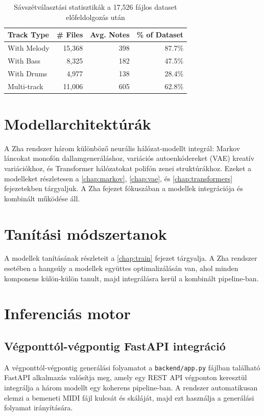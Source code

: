 \begin{table}[ht]
  \centering
  \begin{tabular}{lrrr}
    \toprule
    \textbf{Track Type} & \# Files & Avg. Notes & \% of Dataset \\
    \midrule
    With Melody  & 15,368 & 398 & 87.7\% \\
    With Bass    & 8,325  & 182 & 47.5\% \\
    With Drums   & 4,977  & 138 & 28.4\% \\
    Multi-track  & 11,006 & 605 & 62.8\% \\
    \bottomrule
  \end{tabular}
  \caption{Sávszétválasztási statisztikák a 17,526 fájlos dataset előfeldolgozás után}
\end{table}

\newpage
\section{Modellarchitektúrák}

A Zha rendszer három különböző neurális hálózat-modellt integrál: Markov láncokat monofón dallamgeneráláshoz, variációs autoenkódereket (VAE) kreatív variációkhoz, és Transformer hálózatokat polifón zenei struktúrákhoz. Ezeket a modelleket részletesen a \ref{chap:markov}, \ref{chap:vae}, és \ref{chap:transformers} fejezetekben tárgyaljuk. A Zha fejezet fókuszában a modellek integrációja és kombinált működése áll.

\section{Tanítási módszertanok}

A modellek tanításának részleteit a \ref{chap:train} fejezet tárgyalja. A Zha rendszer esetében a hangsúly a modellek együttes optimalizálásán van, ahol minden komponens külön-külön tanult, majd integrálásra kerül a kombinált pipeline-ban.

\newpage
\section{Inferenciás motor}

\subsection{Végponttól-végpontig FastAPI integráció}

A végponttól-végpontig generálási folyamatot a \texttt{backend/app.py} fájlban található FastAPI alkalmazás valósítja meg, amely egy REST API végponton keresztül integrálja a három modellt egy koherens pipeline-ban. A rendszer automatikusan elemzi a bemeneti MIDI fájl kulcsát és skáláját, majd ezt használja a generálási folyamat irányítására.

